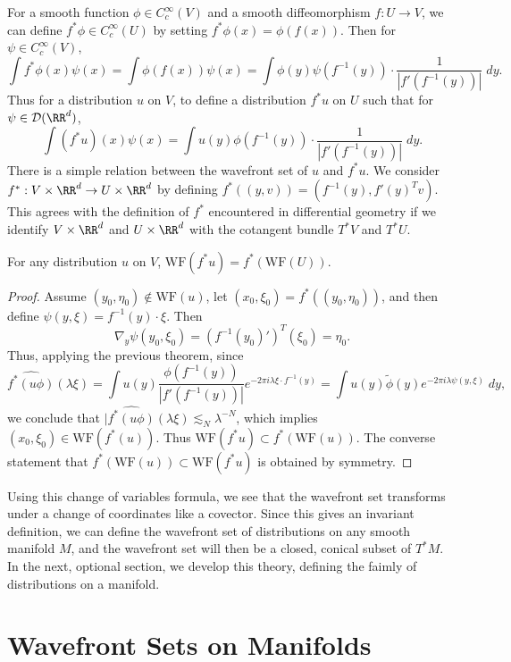 For a smooth function $\phi \in C_c^\infty(V)$ and a smooth diffeomorphism $f: U \to V$, we can define $f^* \phi \in C_c^\infty(U)$ by setting $f^* \phi(x) = \phi(f(x))$. Then for $\psi \in C_c^\infty(V)$,
%
\[ \int f^* \phi(x) \psi(x) = \int \phi(f(x)) \psi(x) = \int \phi(y) \psi(f^{-1}(y)) \cdot \frac{1}{|f'(f^{-1}(y))|} \; dy. \]
%
Thus for a distribution $u$ on $V$, to define a distribution $f^* u$ on $U$ such that for $\psi \in \mathcal{D}(\RR^d)$,
%
\[ \int (f^* u)(x) \psi(x) = \int u(y) \phi(f^{-1}(y)) \cdot \frac{1}{|f'(f^{-1}(y))|}\; dy. \]
%
There is a simple relation between the wavefront set of $u$ and $f^* u$. We consider $f^*: V \times \RR^d \to U \times \RR^d$ by defining $f^*((y,v)) = (f^{-1}(y), f'(y)^T v)$. This agrees with the definition of $f^*$ encountered in differential geometry if we identify $V \times \RR^d$ and $U \times \RR^d$ with the cotangent bundle $T^* V$ and $T^* U$.

\begin{theorem}
    For any distribution $u$ on $V$, $\text{WF}(f^* u) = f^*(\text{WF}(U))$.
\end{theorem}
\begin{proof}
    Assume $(y_0,\eta_0) \not \in \text{WF}(u)$, let $(x_0,\xi_0) = f^*((y_0,\eta_0))$, and then define $\psi(y,\xi) = f^{-1}(y) \cdot \xi$. Then
    \[ \nabla_y \psi(y_0,\xi_0) = (f^{-1}(y_0)')^T(\xi_0) = \eta_0. \]
    Thus, applying the previous theorem, since
    \[ \widehat{f^*(u \phi)}(\lambda \xi) = \int u(y) \frac{\phi(f^{-1}(y))}{|f'(f^{-1}(y))|} e^{-2 \pi i \lambda \xi \cdot f^{-1}(y)} = \int u(y) \tilde{\phi}(y) e^{-2 \pi i \lambda \psi(y,\xi)}\; dy, \]
    we conclude that $|\widehat{f^*(u \phi)}(\lambda \xi) \lesssim_N \lambda^{-N}$, which implies $(x_0,\xi_0) \in \text{WF}(f^*(u))$. Thus $\text{WF}(f^* u) \subset f^*(\text{WF}(u))$. The converse statement that $f^*(\text{WF}(u)) \subset \text{WF}(f^* u)$ is obtained by symmetry.
\end{proof}

Using this change of variables formula, we see that the wavefront set transforms under a change of coordinates like a covector. Since this gives an invariant definition, we can define the wavefront set of distributions on any smooth manifold $M$, and the wavefront set will then be a closed, conical subset of $T^* M$. In the next, optional section, we develop this theory, defining the faimly of distributions on a manifold.

\section{Wavefront Sets on Manifolds}

